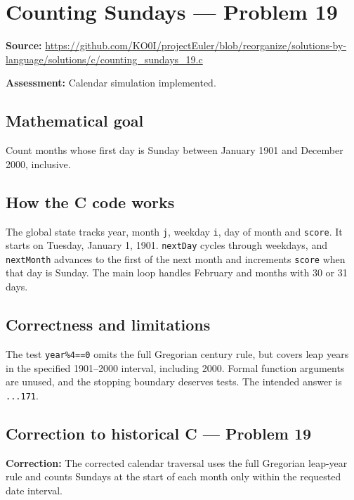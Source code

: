 \section{Counting Sundays --- Problem 19}
\label{prob:19}
\noindent\textbf{Source:} \url{https://github.com/KO0I/projectEuler/blob/reorganize/solutions-by-language/solutions/c/counting_sundays_19.c}

\noindent\textbf{Assessment:} Calendar simulation implemented.

\subsection*{Mathematical goal}
Count months whose first day is Sunday between January 1901 and December 2000, inclusive.

\subsection*{How the C code works}
The global state tracks year, month \verb|j|, weekday \verb|i|, day of month and \verb|score|. It starts on Tuesday, January 1, 1901. \verb|nextDay| cycles through weekdays, and \verb|nextMonth| advances to the first of the next month and increments \verb|score| when that day is Sunday. The main loop handles February and months with 30 or 31 days.

\subsection*{Correctness and limitations}
The test \verb|year%4==0| omits the full Gregorian century rule, but covers leap years in the specified 1901--2000 interval, including 2000. Formal function arguments are unused, and the stopping boundary deserves tests. The intended answer is \texttt{...171}.


\subsection*{Correction to historical C --- Problem 19}
{\color{red}\textbf{Correction:} The corrected calendar traversal uses the full Gregorian leap-year rule and counts Sundays at the start of each month only within the requested date interval.}

